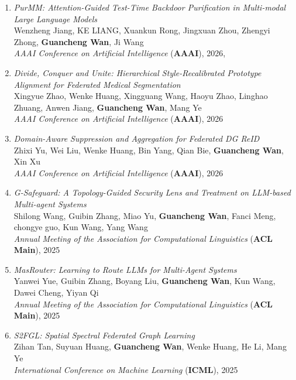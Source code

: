 \begin{enumerate}
    \item \textit{PurMM: Attention-Guided Test-Time Backdoor Purification in Multi-modal Large Language Models} \\
    Wenzheng Jiang, KE LIANG, Xuankun Rong, Jingxuan Zhou, Zhengyi Zhong, \textbf{Guancheng Wan}, Ji Wang \\
    \hfill \textit{AAAI Conference on Artificial Intelligence} (\textbf{AAAI}), 2026, {}

    \item \textit{Divide, Conquer and Unite: Hierarchical Style-Recalibrated Prototype Alignment for Federated Medical Segmentation} \\
    Xingyue Zhao, Wenke Huang, Xingguang Wang, Haoyu Zhao, Linghao Zhuang, Anwen Jiang, \textbf{Guancheng Wan}, Mang Ye \\
    \hfill \textit{AAAI Conference on Artificial Intelligence} (\textbf{AAAI}), 2026

    \item \textit{Domain-Aware Suppression and Aggregation for Federated DG ReID} \\
    Zhixi Yu, Wei Liu, Wenke Huang, Bin Yang, Qian Bie, \textbf{Guancheng Wan}, Xin Xu \\
    \hfill \textit{AAAI Conference on Artificial Intelligence} (\textbf{AAAI}), 2026

    \item \textit{G-Safeguard: A Topology-Guided Security Lens and Treatment on LLM-based Multi-agent Systems} \\
    Shilong Wang, Guibin Zhang, Miao Yu, \textbf{Guancheng Wan}, Fanci Meng, chongye guo, Kun Wang, Yang Wang \\
    \hfill \textit{Annual Meeting of the Association for Computational Linguistics} (\textbf{ACL Main}), 2025

    \item \textit{MasRouter: Learning to Route LLMs for Multi-Agent Systems} \\
    Yanwei Yue, Guibin Zhang, Boyang Liu, \textbf{Guancheng Wan}, Kun Wang, Dawei Cheng, Yiyan Qi \\
    \hfill \textit{Annual Meeting of the Association for Computational Linguistics} (\textbf{ACL Main}), 2025 %

    \item \textit{S2FGL: Spatial Spectral Federated Graph Learning} \\
    Zihan Tan, Suyuan Huang, \textbf{Guancheng Wan}, Wenke Huang, He Li, Mang Ye \\
    \hfill \textit{International Conference on Machine Learning} (\textbf{ICML}), 2025


\end{enumerate}
